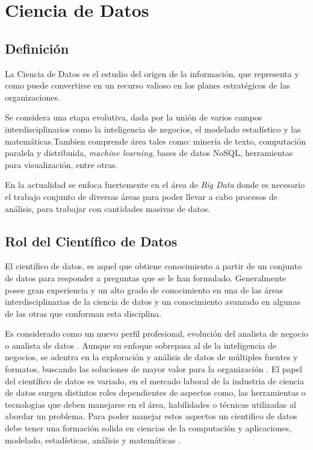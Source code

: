 \section{Ciencia de Datos}

\subsection{Definición}

La Ciencia de Datos es el estudio del origen de la información, que representa  y como puede convertirse en un recurso valioso en los planes estratégicos de las organizaciones.\cite{1rouse}

Se considera una etapa evolutiva, dada por la unión de varios campos interdisciplinarios como la inteligencia de negocios, el modelado estadístico y las matemáticas.\cite{2whatisdatasc}Tambien comprende área tales como: minería de texto, computación paralela y distribuida, \emph{machine learning}, bases de datos NoSQL, herramientas para visualización, entre otras.

En la actualidad se enfoca fuertemente en el área de \emph{Big Data} donde es necesario el trabajo conjunto de diversas áreas para poder llevar a cabo procesos de análisis, para trabajar con cantidades masivas de datos.

\subsection{Rol del Científico de Datos}

El científico de datos, es aquel que obtiene conocimiento a partir de un conjunto de datos para responder a preguntas que se le han formulado.\cite{5pellicer} Generalmente posee gran experiencia y un alto grado de conocimiento en una de las áreas interdisciplinarias de la ciencia de datos y un conocimiento avanzado en algunas de las otras que conforman esta disciplina. 

Es considerado como un nuevo perfil profesional, evolución del analista de negocio o analista de datos \cite{3carbo,4uespana,5pellicer}. Aunque su enfoque sobrepasa al de la inteligencia de negocios, se adentra en la exploración y análisis de datos de múltiples fuentes y formatos, buscando las soluciones de mayor valor para la organización \cite{5pellicer}.
 El papel del científico de datos es variado, en el mercado laboral de la industria de ciencia de datos surgen distintos roles dependientes de aspectos como, las herramientas o tecnologías que deben manejarse en el área, habilidades o técnicas  utilizadas al abordar un problema. Para poder manejar estos aspectos un cientifico de datos debe tener una formación solida en ciencias de la computación y aplicaciones, modelado, estadísticas, análisis y matemáticas \cite{5pellicer}.


